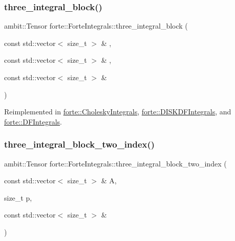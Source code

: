 \subsubsection{\texorpdfstring{three\+\_\+integral\+\_\+block()}{three\_integral\_block()}}
{\footnotesize\ttfamily ambit\+::\+Tensor forte\+::\+Forte\+Integrals\+::three\+\_\+integral\+\_\+block (\begin{DoxyParamCaption}\item[{const std\+::vector$<$ size\+\_\+t $>$ \&}]{,  }\item[{const std\+::vector$<$ size\+\_\+t $>$ \&}]{,  }\item[{const std\+::vector$<$ size\+\_\+t $>$ \&}]{ }\end{DoxyParamCaption})\hspace{0.3cm}{\ttfamily [virtual]}}



Reimplemented in \mbox{\hyperlink{classforte_1_1_cholesky_integrals_a73dccc944cd9fdb00626bc88390136bf}{forte\+::\+Cholesky\+Integrals}}, \mbox{\hyperlink{classforte_1_1_d_i_s_k_d_f_integrals_aa36e8484286f58bcb2b57a7c8fb08a36}{forte\+::\+D\+I\+S\+K\+D\+F\+Integrals}}, and \mbox{\hyperlink{classforte_1_1_d_f_integrals_a830361fd7e2efd8c8d22fd5abcacfad1}{forte\+::\+D\+F\+Integrals}}.

\mbox{\label{classforte_1_1_forte_integrals_aab51824020dc3588c026b5b7740f55a9}} 
\subsubsection{\texorpdfstring{three\+\_\+integral\+\_\+block\+\_\+two\+\_\+index()}{three\_integral\_block\_two\_index()}}
{\footnotesize\ttfamily ambit\+::\+Tensor forte\+::\+Forte\+Integrals\+::three\+\_\+integral\+\_\+block\+\_\+two\+\_\+index (\begin{DoxyParamCaption}\item[{const std\+::vector$<$ size\+\_\+t $>$ \&}]{A,  }\item[{size\+\_\+t}]{p,  }\item[{const std\+::vector$<$ size\+\_\+t $>$ \&}]{ }\end{DoxyParamCaption})\hspace{0.3cm}{\ttfamily [virtual]}}



